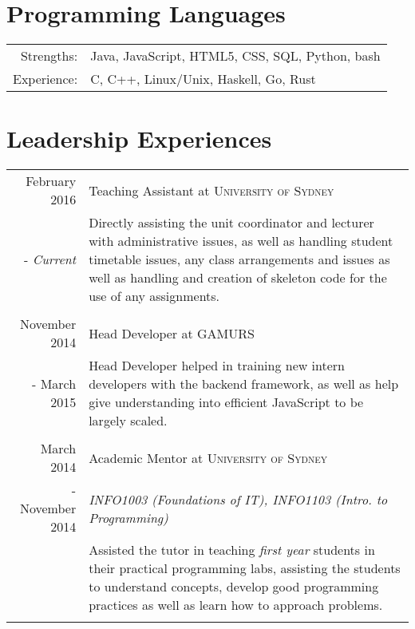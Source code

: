 \documentclass[10pt]{article}
\begin{document}
\section{Programming Languages}
\begin{tabular}{rl}
Strengths: & Java, JavaScript, HTML5, CSS, SQL, Python, bash\\
Experience: & C, C++, Linux/Unix, Haskell, Go, Rust
\end{tabular}

\section{Leadership Experiences} 
\begin{tabular}{r p{11cm}}
February 2016 & Teaching Assistant at \textsc{University of Sydney} \\ - \emph{Current} & \footnotesize{Directly assisting the unit coordinator and lecturer with administrative issues, as well as handling student timetable issues, any class arrangements and issues as well as handling and creation of skeleton code for the use of any assignments.}\\\multicolumn{2}{c}{} \\
November 2014 & Head Developer at \textsc{GAMURS} \\ - March 2015 & \footnotesize{Head Developer helped in training new intern developers with the backend framework, as well as help give understanding into efficient JavaScript to be largely scaled.}\\\multicolumn{2}{c}{} \\
March 2014 & Academic Mentor at \textsc{University of Sydney} \\  - November 2014 & \emph{INFO1003 (Foundations of IT), INFO1103 (Intro. to Programming)} \\ & \footnotesize{Assisted the tutor in teaching \emph{first year} students in their practical programming labs, assisting the students to understand concepts, develop good programming practices as well as learn how to approach problems.}\\\multicolumn{2}{c}{} \\
\end{tabular}


\end{document}
